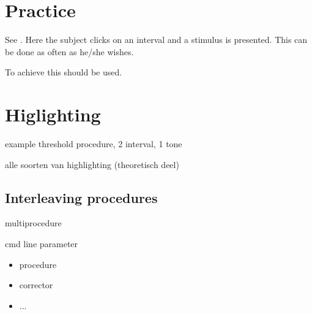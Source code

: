 \section{Practice}


See . Here the
subject clicks on an interval and a stimulus is presented. This
can be done as often as he/she wishes.

To achieve this  should be used.

\section{Higlighting} example threshold
procedure, 2 interval, 1 tone

alle soorten van highlighting (theoretisch deel)

\subsection{Interleaving procedures}

multiprocedure



cmd line parameter


\begin{itemize}
 \item procedure
\item corrector \item ...
\end{itemize}
